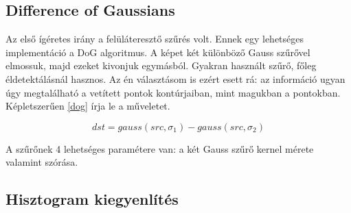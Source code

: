 \subsection{Difference of Gaussians}\label{sect:DoG}

Az első ígéretes irány a felüláteresztő szűrés volt.
Ennek egy lehetséges implementáció a DoG algoritmus.
A képet két különböző Gauss szűrővel elmossuk, majd ezeket kivonjuk egymásból.
Gyakran használt szűrő, főleg éldetektálásnál hasznos.
Az én választásom is ezért esett rá: az információ ugyan úgy megtalálható a vetített pontok kontúrjaiban, mint magukban a pontokban.
Képletszerűen \eqref{dog} írja le a műveletet. 

\begin{equation}
dst = gauss(src, \sigma_1) - gauss(src, \sigma_2)
\label{eq:dog}
\end{equation}

A szűrőnek 4 lehetséges paramétere van: a két Gauss szűrő kernel mérete valamint szórása.

\subsection{Hisztogram kiegyenlítés}\label{sect:histNorm}

